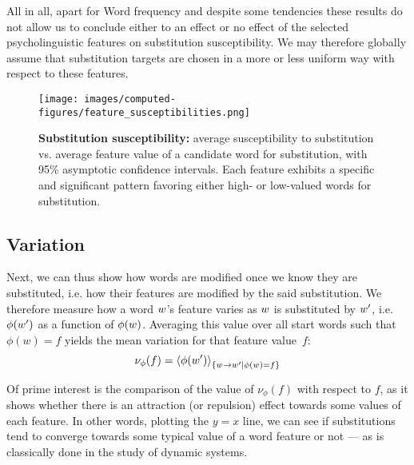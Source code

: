 All in all, apart for Word frequency and despite some tendencies these results do not allow us to conclude either to an effect or no effect of the selected psycholinguistic features on substitution susceptibility.
We may therefore globally assume that substitution targets are chosen in a more or less uniform way with respect to these features.


\begin{figure*}[!th]
    \centering
    \texttt{[image: images/computed-figures/feature\_susceptibilities.png]}
    \caption{\textbf{Substitution susceptibility:} average susceptibility to substitution vs. average feature value of a candidate word for substitution, with 95\% asymptotic confidence intervals.
    Each feature exhibits a specific and significant pattern favoring either high- or low-valued words for substitution.}
    \label{fig:feature-susceptibilities}
\end{figure*}

\subsection{Variation}

Next, we can thus show how words are modified once we know they are substituted, \hbox{i.e.} how their features are modified by the said substitution.
We therefore measure how a word $w$'s feature varies as $w$ is substituted by $w'$, i.e. $\phi(w')$ as a function of $\phi(w)$.
Averaging this value over all start words such that $\phi(w) = f$ yields the mean variation for that feature value~$f$:
$$\nu_{\phi}(f) = \left<\phi(w')\right>_{\left\lbrace w\rightarrow w' | \phi(w) = f \right\rbrace}$$

Of prime interest is the comparison of the value of $\nu_{\phi}(f)$ with respect to $f$, as it shows whether there is an attraction (or repulsion) effect towards some values of each feature.  In other words, plotting the $y=x$ line, we can see if substitutions tend to converge towards some typical value of a word feature or not --- as is classically done in the study of dynamic systems.

